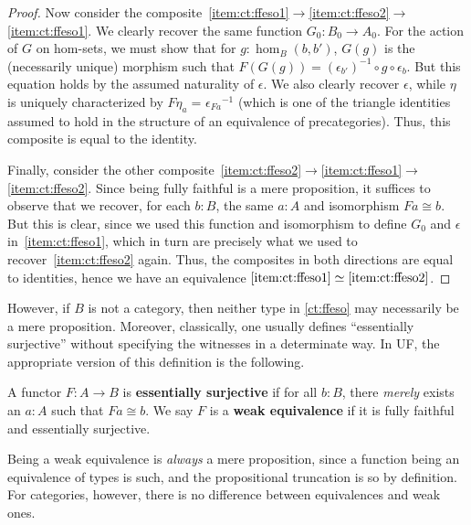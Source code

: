\documentclass{mscs}
\newcommand{\id}[3][]{\ensuremath{#2 =_{#1} #3}\xspace}
\newcommand{\eqv}[2]{\ensuremath{#1 \simeq #2}\xspace}
\numberwithin{equation}{section}
\newcommand{\inv}[1]{{#1}^{-1}}
\begin{document}
\begin{proof}
  Now consider the composite~\ref{item:ct:ffeso1}$\to$\ref{item:ct:ffeso2}$\to$\ref{item:ct:ffeso1}.
  We clearly recover the same function $G_0:B_0 \to A_0$.
  For the action of $G$ on hom-sets, we must show that for $g:\hom_B(b,b')$, $G(g)$ is the (necessarily unique) morphism such that $F(G(g)) = \inv{(\epsilon_{b'})}\circ g \circ \epsilon_b$.
  But this equation holds by the assumed naturality of $\epsilon$.
  We also clearly recover $\epsilon$, while $\eta$ is uniquely characterized by $\id{F\eta_a}{\inv{\epsilon_{Fa}}}$ (which is one of the triangle identities assumed to hold in the structure of an equivalence of precategories).
  Thus, this composite is equal to the identity.

  Finally, consider the other composite~\ref{item:ct:ffeso2}$\to$\ref{item:ct:ffeso1}$\to$\ref{item:ct:ffeso2}.
  Since being fully faithful is a mere proposition, it suffices to observe that we recover, for each $b:B$, the same $a:A$ and isomorphism $F a \cong b$.
  But this is clear, since we used this function and isomorphism to define $G_0$ and $\epsilon$ in~\ref{item:ct:ffeso1}, which in turn are precisely what we used to recover~\ref{item:ct:ffeso2} again.
  Thus, the composites in both directions are equal to identities, hence we have an equivalence \eqv{\ref{item:ct:ffeso1}}{\ref{item:ct:ffeso2}}.
\end{proof}

However, if $B$ is not a category, then neither type in \autoref{ct:ffeso} may necessarily be a mere proposition.
Moreover, classically, one usually defines ``essentially surjective'' without specifying the witnesses in a determinate way.
In UF, the appropriate version of this definition is the following.

\begin{defn}
  A functor $F:A\to B$ is \textbf{essentially surjective} if for all $b:B$, there \emph{merely} exists an $a:A$ such that $Fa\cong b$.
  We say $F$ is a \textbf{weak equivalence} if it is fully faithful and essentially surjective.
\end{defn}

Being a weak equivalence is \emph{always} a mere proposition, since a function being an equivalence of types is such, and the propositional truncation is so by definition.
For categories, however, there is no difference between equivalences and weak ones.
\end{document}
